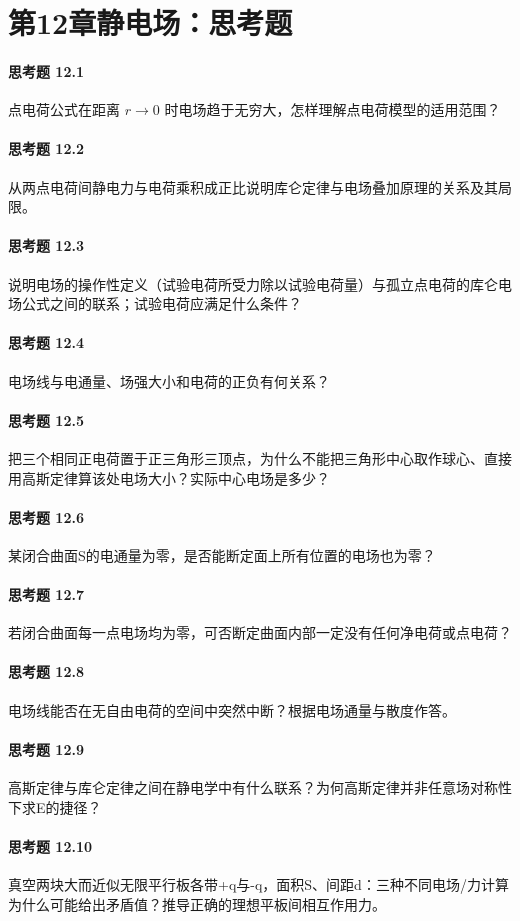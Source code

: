 \section*{第12章\quad 静电场：思考题}
\paragraph{思考题 12.1}
点电荷公式在距离 \(r\to0\) 时电场趋于无穷大，怎样理解点电荷模型的适用范围？

\paragraph{思考题 12.2}
从两点电荷间静电力与电荷乘积成正比说明库仑定律与电场叠加原理的关系及其局限。

\paragraph{思考题 12.3}
说明电场的操作性定义（试验电荷所受力除以试验电荷量）与孤立点电荷的库仑电场公式之间的联系；试验电荷应满足什么条件？

\paragraph{思考题 12.4}
电场线与电通量、场强大小和电荷的正负有何关系？

\paragraph{思考题 12.5}
把三个相同正电荷置于正三角形三顶点，为什么不能把三角形中心取作球心、直接用高斯定律算该处电场大小？实际中心电场是多少？

\paragraph{思考题 12.6}
某闭合曲面S的电通量为零，是否能断定面上所有位置的电场也为零？

\paragraph{思考题 12.7}
若闭合曲面每一点电场均为零，可否断定曲面内部一定没有任何净电荷或点电荷？

\paragraph{思考题 12.8}
电场线能否在无自由电荷的空间中突然中断？根据电场通量与散度作答。

\paragraph{思考题 12.9}
高斯定律与库仑定律之间在静电学中有什么联系？为何高斯定律并非任意场对称性下求E的捷径？

\paragraph{思考题 12.10}
真空两块大而近似无限平行板各带+q与-q，面积S、间距d：三种不同电场/力计算为什么可能给出矛盾值？推导正确的理想平板间相互作用力。
